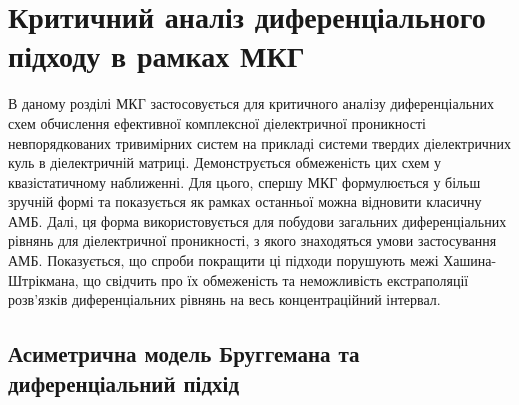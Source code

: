 \documentclass[14pt,twoside]{vakthesis}
\begin{document}
\chapter{Критичний аналіз диференціального підходу в рамках МКГ}\label{sec:Hanai-analysis}

В даному розділі МКГ застосовується для критичного аналізу диференціальних схем обчислення ефективної комплексної діелектричної проникності невпорядкованих тривимірних систем на прикладі системи твердих діелектричних куль в діелектричній матриці. Демонструється обмеженість цих схем у квазістатичному наближенні. Для цього, спершу МКГ формулюється у більш зручній формі та показується як рамках останньої можна відновити класичну АМБ. Далі, ця форма використовується для побудови загальних диференціальних рівнянь для діелектричної проникності, з якого знаходяться умови застосування АМБ. Показується, що спроби покращити ці підходи порушують межі Хашина-Штрікмана, що свідчить про їх обмеженість та неможливість  екстраполяції розв'язків диференціальних рівнянь на весь концентраційний інтервал.


\section{Асиметрична модель Бруггемана та диференціальний підхід}\label{sec:Hanai-intro}
\end{document}
